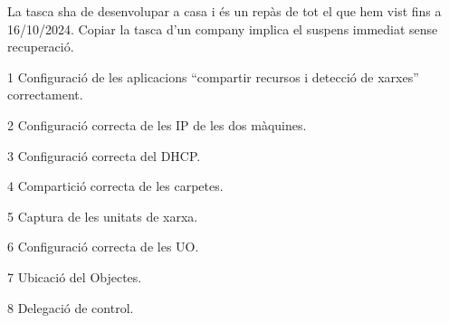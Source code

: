 \documentclass[
  a4paper,
]{article}
\begin{document}
La tasca sha de desenvolupar a casa i és un repàs de tot el que hem vist
fins a 16/10/2024. Copiar la tasca d'un company implica el suspens
immediat sense recuperació.

1 Configuració de les aplicacions ``compartir recursos i detecció de
xarxes'' correctament.

2 Configuració correcta de les IP de les dos màquines.

3 Configuració correcta del DHCP.

4 Compartició correcta de les carpetes.

5 Captura de les unitats de xarxa.

6 Configuració correcta de les UO.

7 Ubicació del Objectes.

8 Delegació de control.
\end{document}
